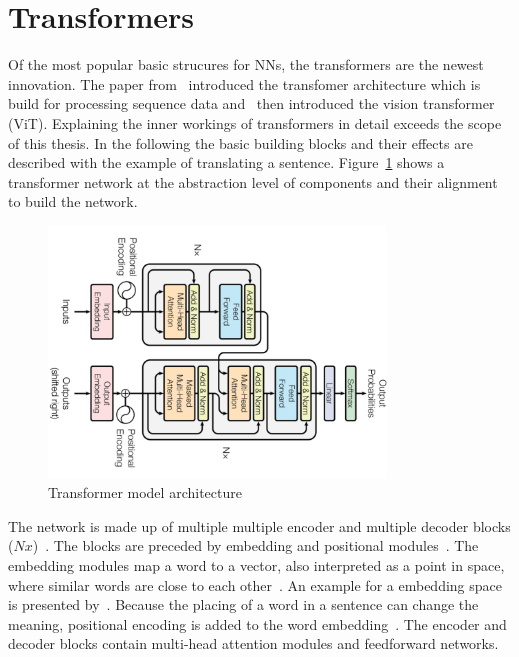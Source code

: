 \section{Transformers}
Of the most popular basic strucures for \acp{NN}, the transformers are the newest innovation.
The paper from~\cite{vaswani_attention_2017} introduced the transfomer architecture which is
build for processing sequence data and~\cite{dosovitskiy_image_2021} then introduced the vision
transformer (ViT).
Explaining the inner workings of transformers in detail exceeds the scope of this thesis.
In the following the basic building blocks and their effects are described with the example of
translating a sentence.
Figure~\ref{fig:transformer} shows a transformer network at the abstraction level of components and
their alignment to build the network.
\begin{figure}[ht]
    \centering
    \includegraphics[width=0.8\textwidth]{img/Transformer-Vaswani-Attention-2017.png}
    \caption{Transformer model architecture~\citep{vaswani_attention_2017}\label{fig:transformer}}
\end{figure}
The network is made up of multiple multiple encoder and multiple decoder
blocks ($Nx$)~\citep{vaswani_attention_2017}.
The blocks are preceded by embedding and positional modules~\citep{vaswani_attention_2017}.
The embedding modules map a word to a vector, also interpreted as a point in space, where similar
words are close to each other~\citep{vaswani_attention_2017}.
An example for a embedding space is presented by~\cite{pennington_glove_2014}.
Because the placing of a word in a sentence can change the meaning, positional
encoding is added to the word embedding~\citep{vaswani_attention_2017}.
The encoder and decoder blocks contain multi-head attention modules and feedforward networks.
